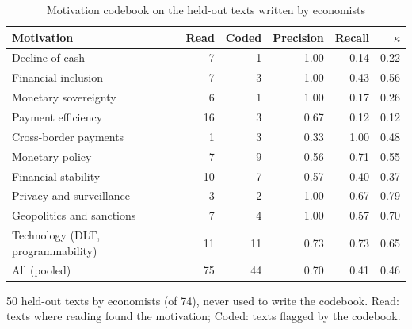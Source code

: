 \begin{table}[htbp]
\centering\small
\caption{Motivation codebook on the held-out texts written by economists}\label{tab:codebook}
\begin{tabular}{@{}lrrrrr@{}}
\toprule
\textbf{Motivation} & \textbf{Read} & \textbf{Coded} & \textbf{Precision} & \textbf{Recall} & $\kappa$ \\
\midrule
Decline of cash & 7 & 1 & 1.00 & 0.14 & 0.22 \\
Financial inclusion & 7 & 3 & 1.00 & 0.43 & 0.56 \\
Monetary sovereignty & 6 & 1 & 1.00 & 0.17 & 0.26 \\
Payment efficiency & 16 & 3 & 0.67 & 0.12 & 0.12 \\
Cross-border payments & 1 & 3 & 0.33 & 1.00 & 0.48 \\
Monetary policy & 7 & 9 & 0.56 & 0.71 & 0.55 \\
Financial stability & 10 & 7 & 0.57 & 0.40 & 0.37 \\
Privacy and surveillance & 3 & 2 & 1.00 & 0.67 & 0.79 \\
Geopolitics and sanctions & 7 & 4 & 1.00 & 0.57 & 0.70 \\
Technology (DLT, programmability) & 11 & 11 & 0.73 & 0.73 & 0.65 \\
\midrule All (pooled) & 75 & 44 & 0.70 & 0.41 & 0.46 \\
\bottomrule
\end{tabular}
\par\smallskip\parbox{0.92\linewidth}{\footnotesize 50 held-out texts by economists (of 74), never used to write the codebook. Read: texts where reading found the motivation; Coded: texts flagged by the codebook.}
\end{table}
